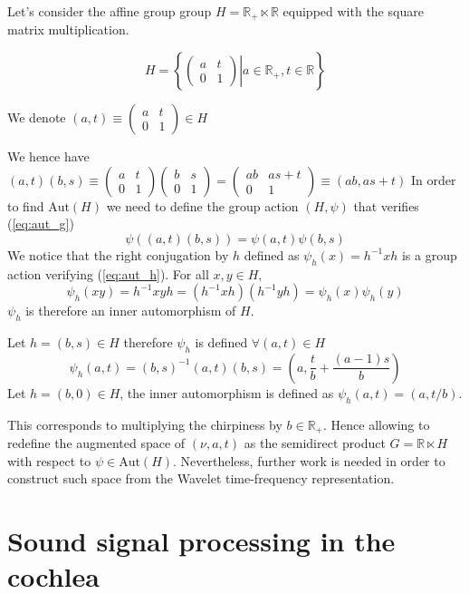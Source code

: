 \documentclass[american,]{article}
\theoremstyle{definition}
\theoremstyle{definition}
\theoremstyle{definition}
\theoremstyle{remark}
\begin{document}
Let's consider the affine group group \(H=\mathbb{R}_+\ltimes\mathbb{R}\) equipped with the square matrix multiplication.

\begin{equation}
H = \left\{\left.\begin{pmatrix}a & t\\0 & 1\end{pmatrix}\right\vert a\in\mathbb{R}_+, t\in\mathbb{R}\right\}
\end{equation}

We denote \((a,t)\equiv \begin{pmatrix}a & t\\0 & 1\end{pmatrix}\in H\)

We hence have \((a,t)(b,s)\equiv\begin{pmatrix}a & t\\0 & 1\end{pmatrix}\begin{pmatrix}b & s\\0 & 1\end{pmatrix}=\begin{pmatrix}ab & as+t\\0 & 1\end{pmatrix}\equiv(ab,as+t)\)
In order to find \(\mathrm{Aut}(H)\) we need to define the group action \((H,\psi)\) that verifies (\ref{eq:aut_g})
\begin{equation}\label{eq:aut_h}
\psi((a,t)(b,s)) = \psi(a,t)\psi(b,s)
\end{equation}
We notice that the right conjugation by \(h\) defined as \(\psi_h(x)=h^{-1}xh\)
is a group action verifying (\ref{eq:aut_h}). For all \(x,y\in H\),
\begin{equation}
\psi_h(xy)=h^{-1}xy h=(h^{-1}xh)(h^{-1}yh)=\psi_h(x)\psi_h(y)
\end{equation}
\(\psi_h\) is therefore an inner automorphism of \(H\).

Let \(h=(b,s)\in H\) therefore \(\psi_h\) is defined \(\forall(a,t)\in H\)
\begin{equation}
\psi_h(a,t)=(b,s)^{-1}(a,t)(b,s)=\left(a, \frac{t}{b}+\frac{(a-1)s}{b}\right)
\end{equation}
Let \(h=(b,0)\in H\), the inner automorphism is defined as \(\psi_h(a,t)=(a,t/b)\).

This corresponds to multiplying the chirpiness by \(b\in\mathbb{R}_+\).
Hence allowing to redefine the augmented space of \((\nu,a,t)\)
as the semidirect product \(G=\mathbb{R}\ltimes H\) with respect to \(\psi\in\mathrm{Aut}(H)\).
Nevertheless, further work is needed in order to construct such space
from the Wavelet time-frequency representation.

\hypertarget{cochlea}{%
\section{Sound signal processing in the cochlea}\label{cochlea}}
\end{document}
